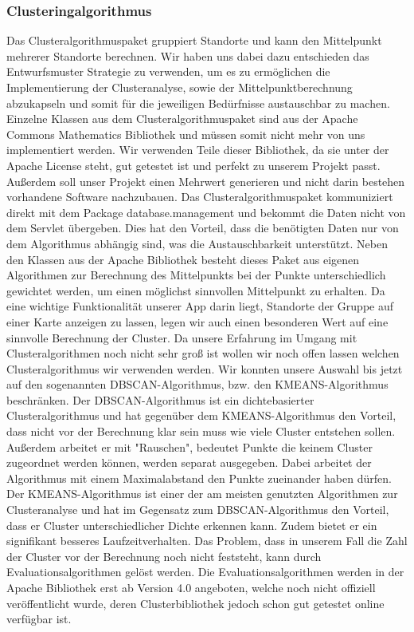 	\subsubsection{Clusteringalgorithmus}

Das Clusteralgorithmuspaket gruppiert Standorte und kann den Mittelpunkt mehrerer Standorte berechnen. Wir haben uns dabei dazu entschieden das Entwurfsmuster Strategie zu verwenden, um es zu ermöglichen die Implementierung der Clusteranalyse, sowie der Mittelpunktberechnung abzukapseln und somit für die jeweiligen Bedürfnisse austauschbar zu machen. Einzelne Klassen aus dem Clusteralgorithmuspaket sind aus der Apache Commons Mathematics Bibliothek und müssen somit nicht mehr von uns implementiert werden. Wir verwenden Teile dieser Bibliothek, da sie unter der Apache License steht, gut getestet ist und perfekt zu unserem Projekt passt. Außerdem soll unser Projekt einen Mehrwert generieren und nicht darin bestehen vorhandene Software nachzubauen. Das Clusteralgorithmuspaket kommuniziert direkt mit dem Package database.management und bekommt die Daten nicht von dem Servlet übergeben. Dies hat den Vorteil, dass die benötigten Daten nur von dem Algorithmus abhängig sind, was die Austauschbarkeit unterstützt. Neben den Klassen aus der Apache Bibliothek besteht dieses Paket aus eigenen Algorithmen zur Berechnung des Mittelpunkts bei der Punkte unterschiedlich gewichtet werden, um einen möglichst sinnvollen Mittelpunkt zu erhalten. Da eine wichtige Funktionalität unserer App darin liegt, Standorte der Gruppe auf einer Karte anzeigen zu lassen, legen wir auch einen besonderen Wert auf eine sinnvolle Berechnung der Cluster. Da unsere Erfahrung im Umgang mit Clusteralgorithmen noch nicht sehr groß ist wollen wir noch offen lassen welchen Clusteralgorithmus wir verwenden werden. Wir konnten unsere Auswahl bis jetzt auf den sogenannten DBSCAN-Algorithmus, bzw. den KMEANS-Algorithmus beschränken. Der DBSCAN-Algorithmus ist ein dichtebasierter Clusteralgorithmus und hat gegenüber dem KMEANS-Algorithmus den Vorteil, dass nicht vor der Berechnung klar sein muss wie viele Cluster entstehen sollen. Außerdem arbeitet er mit "Rauschen", bedeutet Punkte die keinem Cluster zugeordnet werden können, werden separat ausgegeben. Dabei arbeitet der Algorithmus mit einem Maximalabstand den Punkte zueinander haben dürfen. 
Der KMEANS-Algorithmus ist einer der am meisten genutzten Algorithmen zur Clusteranalyse und hat im Gegensatz zum DBSCAN-Algorithmus den Vorteil, dass er Cluster unterschiedlicher Dichte erkennen kann. Zudem bietet er ein signifikant besseres Laufzeitverhalten. Das Problem, dass in unserem Fall die Zahl der Cluster vor der Berechnung noch nicht feststeht, kann durch Evaluationsalgorithmen gelöst werden. Die Evaluationsalgorithmen werden in der Apache Bibliothek erst ab Version 4.0 angeboten, welche noch nicht offiziell veröffentlicht wurde, deren Clusterbibliothek jedoch schon gut getestet online verfügbar ist.
